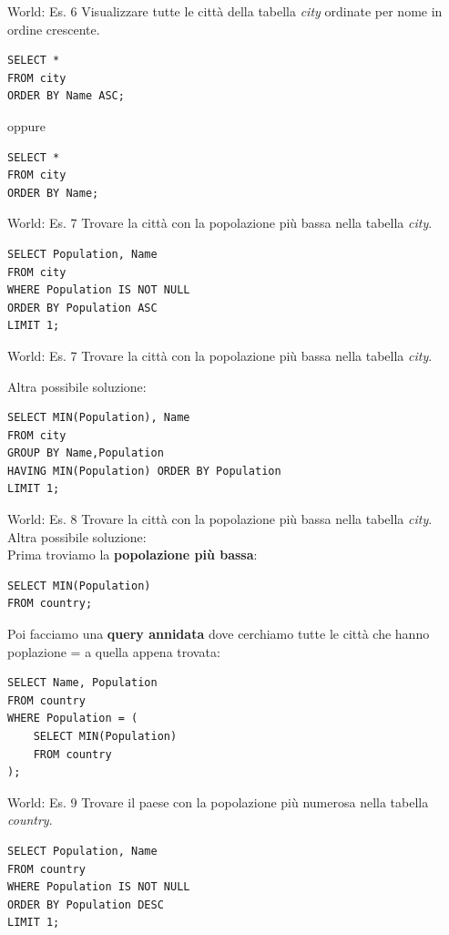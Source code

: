 %
\begin{frame}[fragile]{World: Es. 6}
Visualizzare tutte le citt\`a della tabella \textit{city} ordinate per nome in ordine crescente.
\pause
\begin{lstlisting}
SELECT *
FROM city
ORDER BY Name ASC;
\end{lstlisting}
oppure
\pause
\begin{lstlisting}
SELECT *
FROM city
ORDER BY Name;
\end{lstlisting}
\end{frame}
%
\begin{frame}[fragile]{World: Es. 7}
Trovare la citt\`a con la popolazione pi\`u bassa nella tabella \textit{city}.
\pause
\vspace{-.1cm}
\begin{lstlisting}
SELECT Population, Name
FROM city
WHERE Population IS NOT NULL
ORDER BY Population ASC
LIMIT 1;
\end{lstlisting}
\end{frame}
%
\begin{frame}[fragile]{World: Es. 7}
Trovare la citt\`a con la popolazione pi\`u bassa nella tabella \textit{city}.

Altra possibile soluzione:
\vspace{-.1cm}
\begin{lstlisting}
SELECT MIN(Population), Name
FROM city
GROUP BY Name,Population
HAVING MIN(Population) ORDER BY Population
LIMIT 1;
\end{lstlisting}
\end{frame}
%
\begin{frame}[fragile]{World: Es. 8}
Trovare la citt\`a con la popolazione pi\`u bassa nella tabella \textit{city}.
\\Altra possibile soluzione:
\pause
\\Prima troviamo la \textbf{popolazione pi\`u bassa}:
\begin{lstlisting}
SELECT MIN(Population)
FROM country;
\end{lstlisting}
\pause
Poi facciamo una \textbf{query annidata} dove cerchiamo tutte le citt\`a che hanno poplazione = a quella appena trovata:
\begin{lstlisting}
SELECT Name, Population
FROM country
WHERE Population = (
    SELECT MIN(Population)
    FROM country
);
\end{lstlisting}
\end{frame}
%
\begin{frame}[fragile]{World: Es. 9}
Trovare il paese con la popolazione pi\`u numerosa nella tabella \textit{country}.
\pause
\begin{lstlisting}
SELECT Population, Name
FROM country
WHERE Population IS NOT NULL
ORDER BY Population DESC
LIMIT 1;
\end{lstlisting}
\end{frame}
